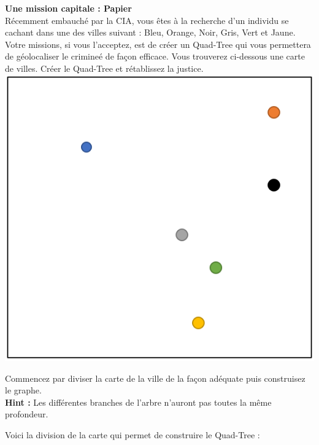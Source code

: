 \begin{Exercice}[10 minutes]\textbf{Une mission capitale : Papier}\\

Récemment embauché par la CIA, vous êtes à la recherche d'un individu se cachant dans une des villes suivant : Bleu, Orange, Noir, Gris, Vert et Jaune. Votre missions, si vous l'acceptez, est de créer un Quad-Tree qui vous permettera de géolocaliser le crimineé de façon efficace. Vous trouverez ci-dessous une carte de villes. Créer le Quad-Tree et rétablissez la justice.\\

\includegraphics[]{Quad-Tree 3.PNG}
\begin{conseil}
    Commencez par diviser la carte de la ville de la façon adéquate puis construisez le graphe.\\
    
    \textbf{Hint : }Les différentes branches de l'arbre n'auront pas toutes la même profondeur.
\end{conseil}
\begin{solution}
    Voici la division de la carte qui permet de construire le Quad-Tree :\\
    

\end{solution}
\end{Exercice}
